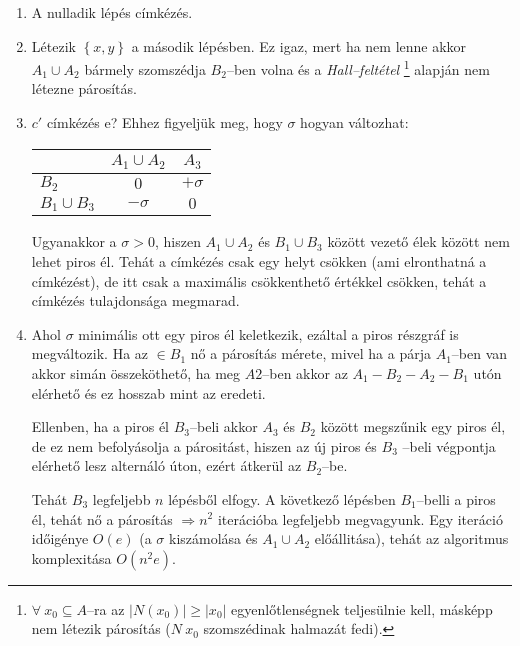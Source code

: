 \begin{enumerate}
  \item A nulladik lépés címkézés.
  \item Létezik $\left\{x,y\right\}$ a második lépésben. Ez igaz, mert ha nem
  lenne akkor $A_1 \cup A_2$ bármely szomszédja $B_2$--ben volna és a
  \emph{Hall--feltétel} \footnote{$ \forall~x_0 \subseteq A$--ra az $|N(x_0)|
  \geq |x_0|$ egyenlőtlenségnek teljesülnie kell, másképp nem létezik párosítás
  ($N~x_0$ szomszédinak halmazát fedi).} alapján nem létezne párosítás.
  \item $c'$ címkézés e? Ehhez figyeljük meg, hogy $\sigma$ hogyan változhat:
  
  \begin{tabular}{ l |  c c }
                  & $A_1 \cup A_2$ & $A_3$ \\
                  \hline
  $B_2$           & $0$            & $+\sigma$ \\
  $B_1 \cup B_3$ & $-\sigma$      & $0$ \\
  \end{tabular}
  
  Ugyanakkor a $\sigma > 0 $, hiszen $A_1 \cup A_2$ és $B_1 \cup B_3$ között
  vezető élek között nem lehet piros él. Tehát a címkézés csak egy helyt csökken
  (ami elronthatná a címkézést), de itt csak a maximális csökkenthető értékkel
  csökken, tehát a címkézés tulajdonsága megmarad.
 
  \item Ahol $\sigma$ minimális ott egy piros él keletkezik, ezáltal a piros
  részgráf is megváltozik. Ha az $\in B_1$ nő a párosítás mérete, mivel ha a
  párja $A_1$--ben van akkor simán összeköthető, ha meg $A2$--ben akkor az
  $A_1-B_2-A_2-B_1$ utón elérhető és ez hosszab mint az eredeti. 
  
  Ellenben, ha a piros él $B_3$--beli akkor $A_3$ és $B_2$ között megszűnik egy
  piros él, de ez nem befolyásolja a párositást, hiszen az új piros és $B_3$
  --beli végpontja elérhető lesz alternáló úton, ezért átkerül az $B_2$--be.
  
  Tehát $B_3$ legfeljebb $n$ lépésből elfogy. A  következő lépésben $B_1$--belli
  a piros él, tehát nő a párosítás $\Rightarrow n^2$ iterációba legfeljebb
  megvagyunk. Egy iteráció időigénye $O(e)$ (a $\sigma$ kiszámolása és $A_1 \cup
  A_2$ előállitása), tehát az algoritmus komplexitása $O(n^2e)$.
  \end{enumerate}